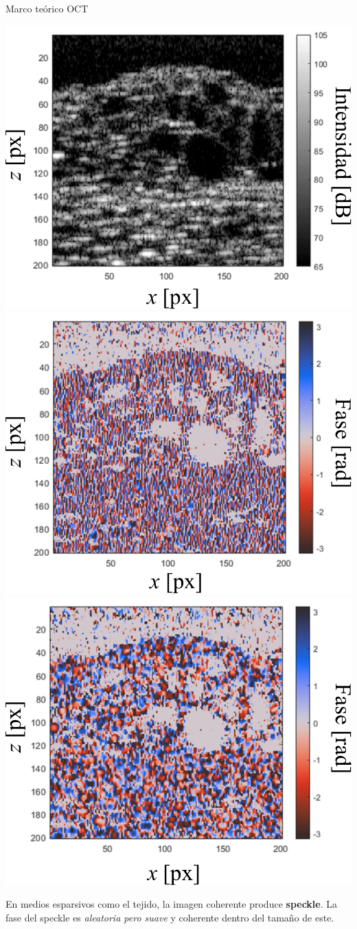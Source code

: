 \documentclass[fleqn,10pt,aspectratio=169,dvipsnames]{beamer}
\begin{document}
\begin{frame}[c]{Marco teórico}{ OCT}

\includegraphics[width=.32\textwidth]{Figuras/Phase_example_1.pdf}
\includegraphics[width=.32\textwidth]{Figuras/Phase_example_2.pdf}
\includegraphics[width=.32\textwidth]{Figuras/Phase_example_3.pdf}

\vspace{\baselineskip}
	\begin{centering}
En medios esparsivos como el tejido, la imagen coherente produce \textbf{speckle}.
La fase del speckle es \textit{aleatoria pero suave} y coherente dentro del tamaño de este. \\
	\end{centering}
\end{frame}
\end{document}
